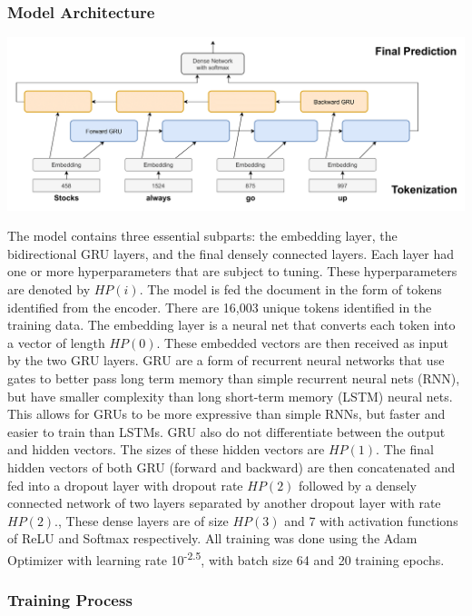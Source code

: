 \documentclass[11pt]{article}
\begin{document}
\subsubsection{Model Architecture}
\includegraphics[width=\textwidth,height=\textheight,keepaspectratio]{architecture.drawio.png}

\noindent The model contains three essential subparts: the embedding layer, the bidirectional GRU layers, and the final densely connected layers. Each layer had one or more hyperparameters that are subject to tuning. These hyperparameters are denoted by $HP(i)$. The model is fed the document in the form of tokens identified from the encoder. There are 16,003 unique tokens identified in the training data. The embedding layer is a neural net that converts each token into a vector of length $HP(0)$. These embedded vectors are then received as input by the two GRU layers. GRU are a form of recurrent neural networks that use gates to better pass long term memory than simple recurrent neural nets (RNN), but have smaller complexity than long short-term memory (LSTM) neural nets. This allows for GRUs to be more expressive than simple RNNs, but faster and easier to train than LSTMs. GRU also do not differentiate between the output and hidden vectors. The sizes of these hidden vectors are $HP(1)$. The final hidden vectors of both GRU (forward and backward) are then concatenated and fed into a dropout layer with dropout rate $HP(2)$ followed by a densely connected network of two layers separated by another dropout layer with rate $HP(2)$., These dense layers are of size $HP(3)$ and 7 with activation functions of ReLU and Softmax respectively. All training was done using the Adam Optimizer with learning rate 10\textsuperscript{-2.5}, with batch size 64 and 20 training epochs.  

\subsubsection{Training Process}
\end{document}
